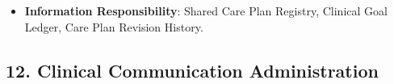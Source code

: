 \begin{itemize}
\begin{itemize}
\item
\textbf{Capability-scoped behaviour: Care Plan Update Distribution} (Feature identity not established):


\begin{itemize}

\item
\emph{Function}: \texttt{} — Broadcasts care plan updates to all enrolled care team participants.



\item
\emph{Exposed Service}: \texttt{} — Emits care plan revision notices.



\end{itemize}


\end{itemize}


\item
\textbf{Information Responsibility}: Shared Care Plan Registry, Clinical Goal Ledger, Care Plan Revision History.



\end{itemize}
\label{rad:sa:196}

\par\smallskip
{}\label{rad:sa:198}
\subsection*{12. Clinical Communication Administration}
\label{rad:sa:199}

